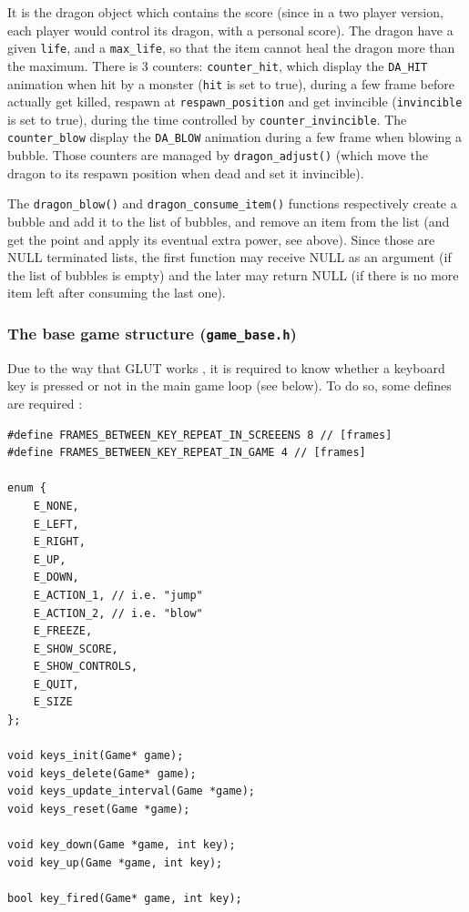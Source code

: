 \documentclass[12pt,a4paper]{article}
\newcommand{\cc}[1]{\texttt{#1}}
\begin{document}
It is the dragon object which contains the score (since in a two player version, each player would control its dragon, with a personal score). The dragon have a given \cc{life}, and a \cc{max_life}, so that the item cannot heal the dragon more than the maximum. There is 3 counters: \cc{counter_hit}, which display the \cc{DA_HIT} animation when hit by a monster (\cc{hit} is set to true), during a few frame before actually get killed, respawn at \cc{respawn_position} and get invincible (\cc{invincible} is set to true), during the time controlled by \cc{counter_invincible}. The \cc{counter_blow} display the \cc{DA_BLOW} animation during a few frame when blowing a bubble. Those counters are managed by \cc{dragon_adjust()} (which move the dragon to its respawn position when dead and set it invincible).

The \cc{dragon_blow()} and \cc{dragon_consume_item()} functions respectively create a bubble and add it to the list of bubbles, and remove an item from the list (and get the point and apply its eventual extra power, see above). Since those are NULL terminated lists, the first function may receive NULL as an argument (if the list of bubbles is empty) and the later may return NULL (if there is no more item left after consuming the last one).

\subsubsection{The base game structure (\texttt{game\_base.h})}

Due to the way that GLUT works \cite{freeglut},  it is required to know whether a keyboard key is pressed or not in the main game loop (see below). To do so, some defines are required :\begin{verbatim}
#define FRAMES_BETWEEN_KEY_REPEAT_IN_SCREEENS 8 // [frames]
#define FRAMES_BETWEEN_KEY_REPEAT_IN_GAME 4 // [frames]

enum {
    E_NONE,
    E_LEFT,
    E_RIGHT,
    E_UP,
    E_DOWN,
    E_ACTION_1, // i.e. "jump"
    E_ACTION_2, // i.e. "blow"
    E_FREEZE,
    E_SHOW_SCORE,
    E_SHOW_CONTROLS,
    E_QUIT,
    E_SIZE
};

void keys_init(Game* game);
void keys_delete(Game* game);
void keys_update_interval(Game *game);
void keys_reset(Game *game);

void key_down(Game *game, int key);
void key_up(Game *game, int key);

bool key_fired(Game* game, int key);
\end{verbatim}
\end{document}
